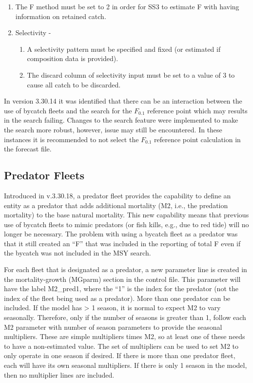 \begin{enumerate}
	\item The F method must be set to 2 in order for SS3 to estimate F with having information on retained catch.
	\item Selectivity - 
	\begin{enumerate}
		\item A selectivity pattern must be specified and fixed (or estimated if composition data is provided).
		\item The discard column of selectivity input must be set to a value of 3 to cause all catch to be discarded.
	\end{enumerate}	
\end{enumerate}

In version 3.30.14 it was identified that there can be an interaction between the use of bycatch fleets and the search for the $F_{0.1}$ reference point which may results in the search failing.  Changes to the search feature were implemented to make the search more robust, however, issue may still be encountered. In these instances it is recommended to not select the $F_{0.1}$ reference point calculation in the forecast file.

\subsection{Predator Fleets}

Introduced in v.3.30.18, a predator fleet provides the capability to define an entity as a predator that adds additional mortality (M2, i.e., the predation mortality) to the base natural mortality. This new capability means that previous use of bycatch fleets to mimic predators (or fish kills, e.g., due to red tide) will no longer be necessary. The problem with using a bycatch fleet as a predator was that it still created an ``F'' that was included in the reporting of total F even if the bycatch was not included in the MSY search.

For each fleet that is designated as a predator, a new parameter line is created in the mortality-growth (MGparm) section in the control file. This parameter will have the label M2\_pred1, where the ``1'' is the index for the predator (not the index of the fleet being used as a predator). More than one predator can be included. If the model has > 1 season, it is normal to expect M2 to vary seasonally. Therefore, only if the number of seasons is greater than 1, follow each M2 parameter with number of season parameters to provide the seasonal multipliers. These are simple multipliers times M2, so at least one of these needs to have a non-estimated value. The set of multipliers can be used to set M2 to only operate in one season if desired. If there is more than one predator fleet, each will have its own seasonal multipliers. If there is only 1 season in the model, then no multiplier lines are included.

